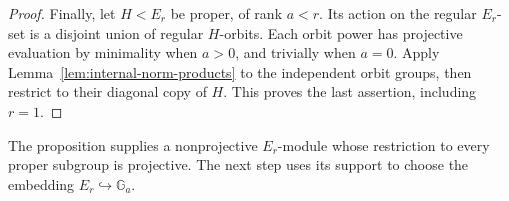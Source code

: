 \begin{proof}
Finally, let $H<E_r$ be proper, of rank $a<r$.  Its action on the
regular $E_r$-set is a disjoint union of regular $H$-orbits.  Each orbit
power has projective evaluation by minimality when $a>0$, and trivially
when $a=0$.  Apply Lemma~\ref{lem:internal-norm-products} to the
independent orbit groups, then restrict to their diagonal copy of $H$.
This proves the last assertion, including $r=1$.
\end{proof}

The proposition supplies a nonprojective $E_r$-module whose restriction
to every proper subgroup is projective.  The next step uses its support
to choose the embedding $E_r\hookrightarrow\mathbb G_a$.

